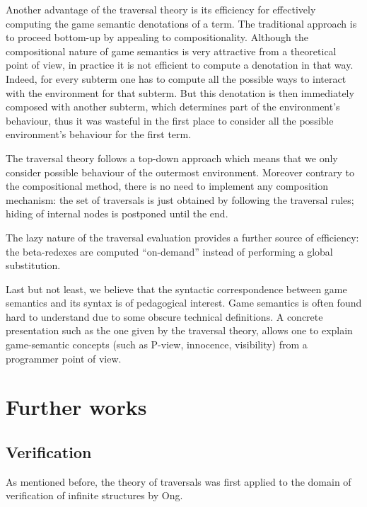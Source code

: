 Another advantage of the traversal theory is its efficiency for effectively computing the game semantic denotations of a term.
The traditional approach is to proceed bottom-up by appealing to compositionality.
Although the compositional nature of game semantics is very attractive from a theoretical point of view, in practice it is not efficient to compute a denotation in that way. Indeed, for every subterm one has to compute all the possible ways to interact with the environment for that subterm. But this denotation is then immediately composed with another subterm, which determines part of the environment's behaviour, thus it was wasteful in the first place to consider all the possible environment's behaviour for the first term.

The traversal theory follows a top-down approach which means that we only consider possible behaviour of the outermost environment.
Moreover contrary to the compositional method, there is no need to implement any composition mechanism: the set of traversals is just obtained by following the traversal rules; hiding of internal nodes is postponed until the end.

The lazy nature of the traversal evaluation provides a further source of efficiency: the beta-redexes are computed ``on-demand'' instead of performing a global substitution.
\smallskip

Last but not least, we believe that the syntactic correspondence between game semantics and its syntax
is of pedagogical interest. Game semantics is often found hard to understand due to some obscure technical definitions.
A concrete presentation such as the one given by the traversal theory, allows one to explain game-semantic concepts
(such as P-view, innocence, visibility) from a programmer point of view.


\section{Further works}

\subsection{Verification} As mentioned before, the theory of traversals was first applied to the domain of verification of infinite structures by Ong.



